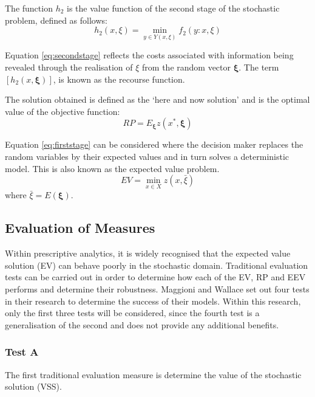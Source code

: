 \documentclass[../thesis.tex]{subfiles}
\begin{document}
{The function $h_2$ is the value function of the second stage of the stochastic problem, defined as follows:
\begin{equation}\label{eq:secondstage}
    h_{2}(x,\xi) = \min_{y\in Y (x,\xi)} f_{2}(y:x,\xi)
\end{equation}

Equation \eqref{eq:secondstage} reflects the costs associated with information being revealed through the realisation of $\xi$ from the random vector $\boldsymbol{\xi}$. The term $\left[h_2(x, \boldsymbol{\xi})\right]$, is known as the recourse function. 

The solution obtained is defined as the `here and now solution' and is the optimal value of the objective function:
\begin{equation}
    RP = E_{\boldsymbol{\xi}} z(x^{*},\boldsymbol{\xi})
\end{equation}

Equation \eqref{eq:firststage} can be considered where the decision maker replaces the random variables by their expected values and in turn solves a deterministic model. This is also known as the expected value problem.
\begin{equation}\label{eq:deterministic}
    EV = \min_{x\in X} z(x, \bar\xi)
\end{equation}
where $\bar \xi = E(\boldsymbol{\xi})$.

\subsection{Evaluation of Measures}
Within prescriptive analytics, it is widely recognised that the expected value solution (EV) can behave poorly in the stochastic domain. Traditional evaluation tests can be carried out in order to determine how each of the EV, RP and EEV performs and determine their robustness. Maggioni and Wallace \cite{Maggioni2010} set out four tests in their research to determine the success of their models. Within this research, only the first three tests will be considered, since the fourth test is a generalisation of the second and does not provide any additional benefits.

\subsubsection{Test A}\label{sec:TestA}
The first traditional evaluation measure is determine the value of the stochastic solution (VSS).


}
\end{document}
